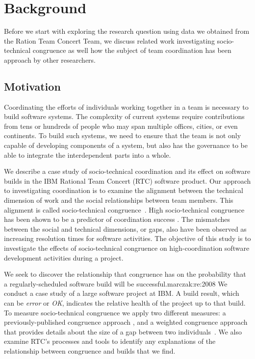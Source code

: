 %


\section{Background}
\label{sec:background}
Before we start with exploring the research question using data we obtained from the Ration Team Concert Team, we discuss related work investigating socio-technical congruence as well how the subject of team coordination has been approach by other researchers.

\subsection{Motivation}
Coordinating the efforts of individuals working together in a team is
necessary to build software systems. The complexity of current systems require contributions
from tens or hundreds of people who may span multiple offices, cities, or even continents.
To build such systems, we need to ensure that the team is not only capable of
developing components of a system, but also has the governance to be able to integrate the
interdependent parts into a whole.

We describe a case study of socio-technical coordination and its effect on software builds in the IBM
Rational Team Concert (RTC) software product.
Our approach to investigating coordination is to examine the
alignment between the technical dimension of work and the social relationships
between team members. This alignment is called socio-technical
congruence~\cite{cataldo:cscw:2006}. High socio-technical congruence
has been shown to be a predictor of coordination success
\cite{cataldo:cscw:2006,ehrlich2008:gaps}.
The mismatches between the social and technical dimensions, or gaps,
also have been observed as increasing resolution times for software activities.
The objective of this study is to investigate the effects of socio-technical congruence on high-coordination software development activities during a project.

We seek to discover the relationship that congruence has on the probability that a regularly-scheduled software build will be successful.marczak:re:2008
We conduct a case study of a large software project at IBM.  A build result, which can be \emph{error} or \emph{OK}, indicates the relative health of the project up to that build. To
measure socio-technical congruence we apply two different measures: a
previously-published congruence approach \cite{cataldo:cscw:2006},
and a weighted congruence approach that provides details about the size of a
gap between two individuals~\cite{kwan2009:weighted}. We
also examine RTC's processes and tools to identify any
explanations of the relationship between congruence and builds that
we find.


